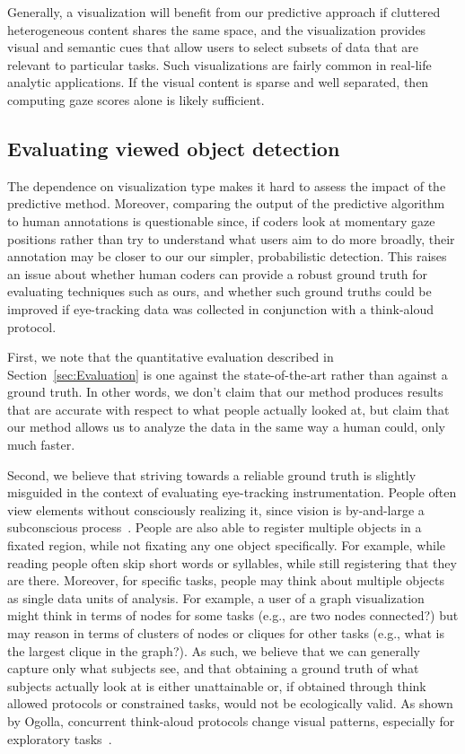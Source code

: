 Generally, a visualization will benefit from our predictive approach if cluttered heterogeneous content shares the same space, and the visualization provides visual and semantic cues that allow users to select subsets of  data that are relevant to particular tasks. Such visualizations are fairly common in real-life analytic applications. If the visual content is sparse and well separated, then computing gaze scores alone is likely sufficient.

\subsection{Evaluating viewed object detection} 
\label{sec:DiscussionEvaluatingViewedObjectDetection}

The dependence on visualization type makes it hard to assess the impact of the predictive method. Moreover, comparing the output of the predictive algorithm to human annotations is questionable since, if coders look at momentary gaze positions rather than try to understand what users aim to do more broadly, their annotation may be closer to our our simpler, probabilistic detection.  This raises an issue about whether human coders can provide a robust ground truth for evaluating techniques such as ours, and whether such ground truths could be improved if eye-tracking data was collected in conjunction with a think-aloud protocol.

First, we note that the quantitative evaluation described in Section~\ref{sec:Evaluation} is one against the state-of-the-art rather than against a ground truth. In other words, we don't claim that our method produces results that are accurate with respect to what people actually looked at, but claim that our method allows us to analyze the data in the same way a human could, only much faster. 

Second, we believe that striving towards a reliable ground truth is slightly misguided in the context of evaluating eye-tracking instrumentation.  People often view elements without consciously realizing it, since vision is by-and-large a subconscious process~\cite{duchowski2007eye}. People are also able to register multiple objects in a fixated region, while not fixating any one object specifically. For example, while reading people often skip short words or syllables, while still registering that they are there. Moreover, for specific tasks, people may think about multiple objects as single data units of analysis. For example, a user of a graph visualization might think in terms of nodes for some tasks (e.g., are two nodes connected?) but may reason in terms of clusters of nodes or cliques for other tasks (e.g., what is the largest clique in the graph?).  As such, we believe that we can generally capture only what subjects see, and that obtaining a ground truth of what subjects actually look at is either unattainable or, if obtained through think allowed protocols or constrained tasks, would not be ecologically valid. As shown by Ogolla, concurrent think-aloud protocols change visual patterns, especially for exploratory tasks~\cite{ogolla2011usability}.

